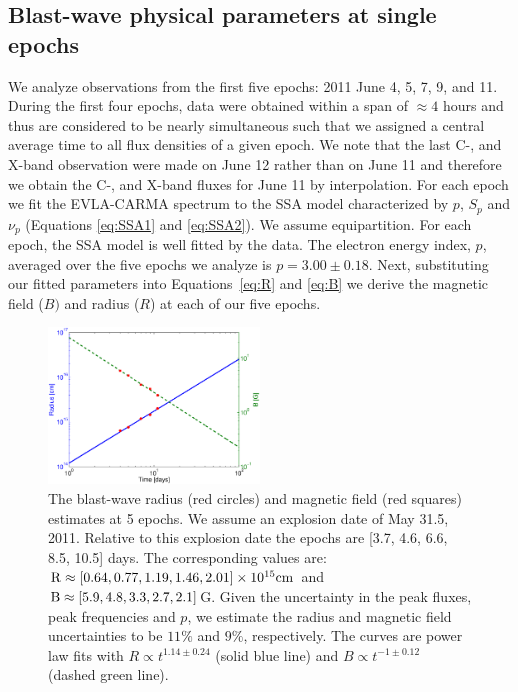 \documentclass{emulateapj}
\begin{document}
\subsection{Blast-wave physical parameters at single epochs}
\label{sec:equip}
We analyze observations from the first five epochs: 2011 June 4, 5, 7,
9, and 11. During the first four epochs, data were obtained within a
span of $\approx 4$ hours and thus are considered to be nearly
simultaneous such that we assigned a central average time to all flux
densities of a given epoch. We note that the last C-, and X-band
observation were made on June 12 rather than on June 11 and therefore
we obtain the C-, and X-band fluxes for June 11 by
interpolation. For each epoch we fit the EVLA-CARMA spectrum to the
SSA model characterized by $p$, $S_p$ and
$\nu_p$ (Equations \ref{eq:SSA1} and \ref{eq:SSA2}). We assume
equipartition. 
For each epoch, the SSA model is
well fitted by the data. The electron energy index, 
$p$, averaged over the five epochs we analyze is $p=3.00\pm 0.18$.  
Next, substituting our fitted parameters into Equations~\ref{eq:R} and \ref{eq:B} 
we derive the magnetic field ($B)$ and radius ($R$) at each of our
five epochs. 


\begin{figure}
\centering
\includegraphics[width=0.5\textwidth]{RSN_R_B_combo.eps}
\caption{The blast-wave radius (red circles) and magnetic field
  (red squares) estimates at 5 epochs. We assume an explosion date of May
  31.5, 2011. Relative to this explosion date the epochs are [3.7,
  4.6, 6.6, 8.5, 10.5] days. 
The corresponding values are: 
${\rm R}\approx[0.64, 0.77,
1.19, 1.46, 2.01]\times 10^{15} {\rm cm}$ and ${\rm B}\approx[5.9, 4.8, 3.3, 2.7, 2.1]$G. 
Given the uncertainty in
the peak fluxes, peak frequencies and $p$, we estimate the radius
and magnetic field uncertainties to be $11\%$ and $9\%$,
respectively.
The curves are power law fits
  with $R\propto t^{1.14\pm 0.24}$ (solid blue line) and $B\propto
  t^{-1\pm 0.12}$ (dashed green line).}
\end{figure}
\end{document}
